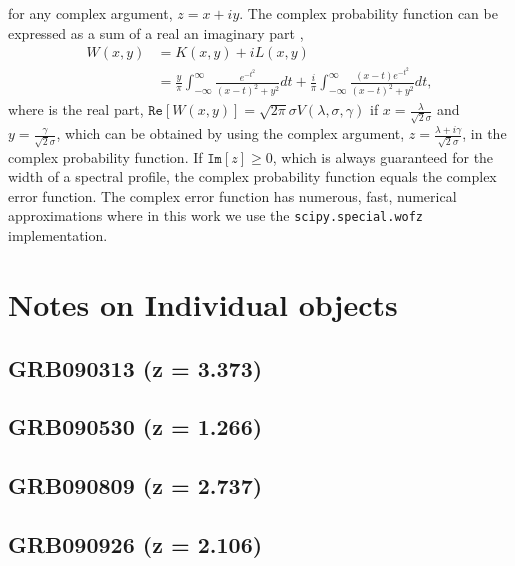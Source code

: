 \documentclass{aa}    %
\begin{document}
for any complex argument, $z = x + iy$. The complex probability function can be expressed as a sum of a real an imaginary part \citep{benner1995, abrarov2015b},
\begin{equation} 
\begin{split}
W(x, y)  
& = K(x, y) + i L(x, y) \\
& = \frac{y}{\pi}  \int_{-\infty}^{\infty} \frac{e^{- t^2 }}{(x -  t)^2 +y^2} dt  + \frac{i}{\pi}  \int_{-\infty}^{\infty} \frac{(x - t)e^{- t^2 }}{(x -  t)^2 +y^2} dt,
\end{split}
\end{equation}
where is the real part, $\mathtt{Re}[W(x, y)] =  \sqrt{2 \pi} \sigma V(\lambda,\sigma, \gamma)$ if $x = \frac{\lambda}{\sqrt{2} \sigma}$ and $y = \frac{\gamma}{\sqrt{2} \sigma}$, which can be obtained by using the complex argument, $z = \frac{\lambda + i\gamma}{\sqrt{2} \sigma}$, in the complex probability function. If $\mathtt{Im}[z] \geq 0$, which is always guaranteed for the width of a spectral profile, the complex probability function equals the complex error function. The complex error function has numerous, fast, numerical approximations where in this work we use the \texttt{scipy.special.wofz} \citep{scipy} implementation.




\section{Notes on Individual objects}

\subsection{GRB090313 (z = 3.373)}


\subsection{GRB090530 (z = 1.266)}


\subsection{GRB090809 (z = 2.737)}


\subsection{GRB090926 (z = 2.106)}
\end{document}

